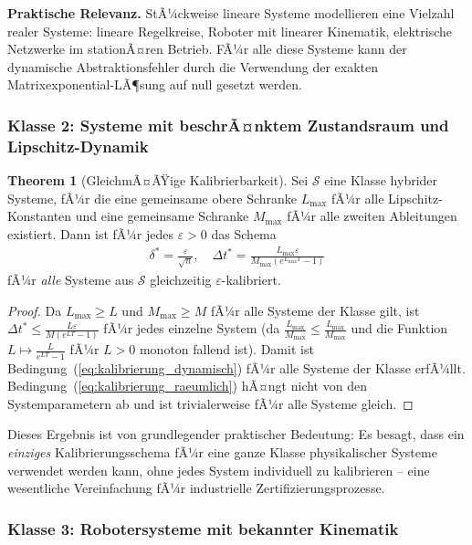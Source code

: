 ﻿\documentclass[a4paper,12pt]{article}
\theoremstyle{definition}
\newtheorem{theorem}{Theorem}[section]
\begin{document}
\textbf{Praktische Relevanz.} StÃ¼ckweise lineare Systeme modellieren eine Vielzahl realer Systeme: lineare Regelkreise, Roboter mit linearer Kinematik, elektrische Netzwerke im stationÃ¤ren Betrieb. FÃ¼r alle diese Systeme kann der dynamische Abstraktionsfehler durch die Verwendung der exakten Matrixexponential-LÃ¶sung auf null gesetzt werden.

\subsubsection{Klasse 2: Systeme mit beschrÃ¤nktem Zustandsraum und Lipschitz-Dynamik}

\begin{theorem}[GleichmÃ¤ÃŸige Kalibrierbarkeit]
\label{thm:gleichmaessig_kalibrierbar}
Sei $\mathcal{S}$ eine Klasse hybrider Systeme, fÃ¼r die eine gemeinsame obere Schranke $L_{\max}$ fÃ¼r alle Lipschitz-Konstanten und eine gemeinsame Schranke $M_{\max}$ fÃ¼r alle zweiten Ableitungen existiert. Dann ist fÃ¼r jedes $\varepsilon > 0$ das Schema
\begin{align}
  \delta^* = \frac{\varepsilon}{\sqrt{n}}, \quad \Delta t^* = \frac{L_{\max}\varepsilon}{M_{\max}(e^{L_{\max}T}-1)}
\end{align}
fÃ¼r \emph{alle} Systeme aus $\mathcal{S}$ gleichzeitig $\varepsilon$-kalibriert.
\end{theorem}

\begin{proof}
Da $L_{\max} \geq L$ und $M_{\max} \geq M$ fÃ¼r alle Systeme der Klasse gilt, ist $\Delta t^* \leq \frac{L\varepsilon}{M(e^{LT}-1)}$ fÃ¼r jedes einzelne System (da $\frac{L_{\max}}{M_{\max}} \leq \frac{L_{\max}}{M_{\max}}$ und die Funktion $L \mapsto \frac{L}{e^{LT}-1}$ fÃ¼r $L > 0$ monoton fallend ist). Damit ist Bedingung~(\ref{eq:kalibrierung_dynamisch}) fÃ¼r alle Systeme der Klasse erfÃ¼llt. Bedingung~(\ref{eq:kalibrierung_raeumlich}) hÃ¤ngt nicht von den Systemparametern ab und ist trivialerweise fÃ¼r alle Systeme gleich.
\end{proof}

Dieses Ergebnis ist von grundlegender praktischer Bedeutung: Es besagt, dass ein \emph{einziges} Kalibrierungsschema fÃ¼r eine ganze Klasse physikalischer Systeme verwendet werden kann, ohne jedes System individuell zu kalibrieren -- eine wesentliche Vereinfachung fÃ¼r industrielle Zertifizierungsprozesse.

\subsubsection{Klasse 3: Robotersysteme mit bekannter Kinematik}
\end{document}
